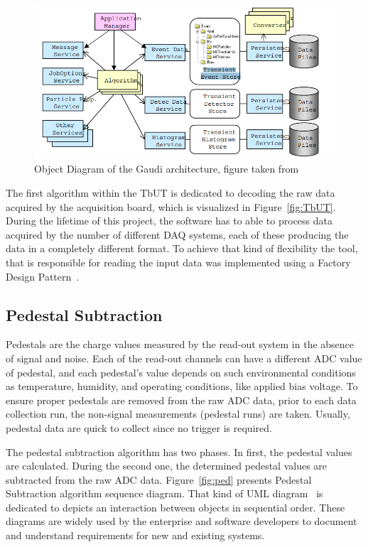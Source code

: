 \begin{figure}[h]
\centering
\includegraphics{figures/Gaudi.png}
\caption{Object Diagram of the Gaudi architecture, figure taken from~\cite{gaudi} }
\label{fig:gaudi flow}
\end{figure}


The first algorithm within the TbUT is dedicated to decoding the raw data acquired by the acquisition board, which is visualized in Figure~\ref{fig:TbUT}.  
During the lifetime of this project, the software has to able to process data acquired by the number of different DAQ systems, each of these producing the data in a completely different format.  To achieve that kind of flexibility the tool, that is responsible for reading the input data was implemented using a Factory Design Pattern~\cite{DesignPatterns}. 

\subsection{Pedestal Subtraction}

Pedestals are the charge values measured by the read-out system in the absence of signal and noise. Each of the read-out channels can have a different ADC value of pedestal, and each pedestal's value depends on such environmental conditions as temperature, humidity, and operating conditions, like applied bias voltage. 
To ensure proper pedestals are removed from the raw ADC data, prior to each data collection run, the non-signal measurements (pedestal runs) are taken. Usually, pedestal data are quick to collect since no trigger is required. 

The pedestal subtraction algorithm has two phases. In first, the pedestal values are calculated. During the second one, the determined pedestal values are subtracted from the raw ADC data. Figure~\ref{fig:ped} presents Pedestal Subtraction algorithm sequence diagram. That kind of UML diagram~\cite{UML} is dedicated to depicts an interaction between objects in sequential order. These diagrams are widely used by the enterprise and software developers to document and understand requirements for new and existing systems. 

